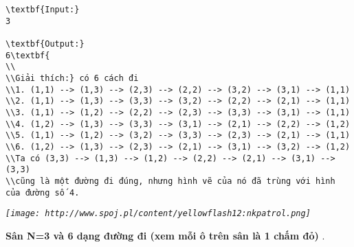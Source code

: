 \begin{verbatim}
\textbf{Input:}
3

\textbf{Output:}
6\textbf{
\\
\\Giải thích:} có 6 cách đi
\\1. (1,1) --> (1,3) --> (2,3) --> (2,2) --> (3,2) --> (3,1) --> (1,1)
\\2. (1,1) --> (1,3) --> (3,3) --> (3,2) --> (2,2) --> (2,1) --> (1,1)
\\3. (1,1) --> (1,2) --> (2,2) --> (2,3) --> (3,3) --> (3,1) --> (1,1)
\\4. (1,2) --> (1,3) --> (3,3) --> (3,1) --> (2,1) --> (2,2) --> (1,2)
\\5. (1,1) --> (1,2) --> (3,2) --> (3,3) --> (2,3) --> (2,1) --> (1,1)
\\6. (1,2) --> (1,3) --> (2,3) --> (2,1) --> (3,1) --> (3,2) --> (1,2)
\\Ta có (3,3) --> (1,3) --> (1,2) --> (2,2) --> (2,1) --> (3,1) --> (3,3) 
\\cũng là một đường đi đúng, nhưng hình vẽ của nó đã trùng với hình của đường số 4.\end{verbatim}

\emph{
\texttt{[image: http://www.spoj.pl/content/yellowflash12:nkpatrol.png]}}

\textbf{    Sân N=3 và 6 dạng đường đi (xem mỗi ô trên sân là 1 chấm đỏ)   }   .